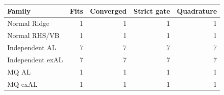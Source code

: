 \begin{tabular}{lrrrr}
\toprule
Family & Fits & Converged & Strict gate & Quadrature \\
\midrule
Normal Ridge & 1 & 1 & 1 & 1 \\
Normal RHS/VB & 1 & 1 & 1 & 1 \\
Independent AL & 7 & 7 & 7 & 7 \\
Independent exAL & 7 & 7 & 7 & 7 \\
MQ AL & 1 & 1 & 1 & 1 \\
MQ exAL & 1 & 1 & 1 & 1 \\
\bottomrule
\end{tabular}
